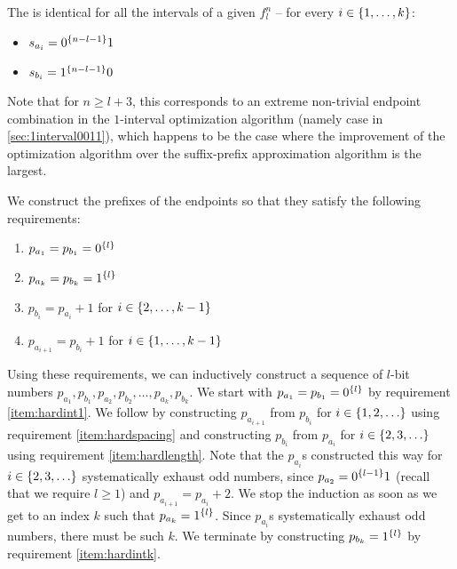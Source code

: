 The  is identical for all the intervals
of a given $f_l^n$
-- for every $i \in \{1, \ldots, k\}$:

\begin{itemize}
\item $s_{a_i} = 0^{\{n-l-1\}} 1$
\item $s_{b_i} = 1^{\{n-l-1\}} 0$
\end{itemize}

Note that for $n \geq l + 3$,
this  corresponds to an extreme
non-trivial endpoint combination in the $1$-interval
optimization algorithm
(namely case 
in \autoref{sec:1interval0011}),
which happens to be the case where the improvement
of the optimization algorithm
over the suffix-prefix approximation algorithm
is the largest.

We construct the  prefixes of the endpoints
so that they
satisfy the following requirements:

\begin{enumerate}
\item \label{item:hardint1}
$p_{a_1} = p_{b_1} = 0^{\{l\}}$
\item \label{item:hardintk}
$p_{a_k} = p_{b_k} = 1^{\{l\}}$
\item \label{item:hardlength}
$p_{b_i} = p_{a_i} + 1$
for $i \in \{2, \ldots, k-1\}$
\item \label{item:hardspacing}
$p_{a_{i+1}} = p_{b_i} + 1$
for $i \in \{1, \ldots, k-1\}$
\end{enumerate}

Using these requirements,
we can inductively construct a sequence of $l$-bit numbers
$p_{a_1}, p_{b_1}, p_{a_2}, p_{b_2}, \ldots,
p_{a_k}, p_{b_k}$.
We start with
$p_{a_1} = p_{b_1} = 0^{\{l\}}$
by requirement \ref{item:hardint1}.
We follow by
constructing $p_{a_{i+1}}$ from $p_{b_i}$
for $i \in \{1, 2, \ldots\}$
using requirement \ref{item:hardspacing} and
constructing $p_{b_i}$ from $p_{a_i}$
for $i \in \{2, 3, \ldots\}$
using requirement \ref{item:hardlength}.
Note that the $p_{a_i}$s constructed this way
for $i \in \{2, 3, \ldots\}$
systematically
exhaust odd numbers,
since $p_{a_2} = 0^{\{l-1\}} 1$
(recall that we require $l \geq 1$)
and $p_{a_{i+1}} = p_{a_i} + 2$.
We stop the induction
as soon as we get to an index $k$ such that
$p_{a_k} = 1^{\{l\}}$.
Since $p_{a_i}$s systematically exhaust odd numbers,
there must be such $k$.
We terminate by constructing $p_{b_k} = 1^{\{l\}}$
by requirement \ref{item:hardintk}.

